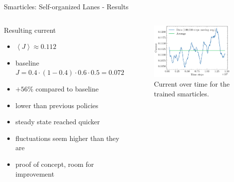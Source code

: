 \documentclass[10pt,xcolor=table, aspectratio=1610]{beamer}
\begin{document}
\begin{frame}{Smarticles: Self-organized Lanes - Results}
  \begin{columns}
    \begin{block}{Resulting current}
      \begin{itemize}
        \item $\left\langle J \right\rangle \approx 0.112$
        \item baseline $J=0.4\cdot(1-0.4)\cdot0.6\cdot0.5=0.072$
        \item $+56\%$ compared to baseline
        \item lower than previous policies
        \item steady state reached quicker
        \item fluctuations seem higher than they are
        \item proof of concept, room for improvement
      \end{itemize}
    \end{block}
    \begin{figure}
        \includegraphics[width=\textwidth]{../Thesis/img/results/lanes_current.pdf}
        \caption*{Current over time for the trained smarticles.}
      \end{figure}
  \end{columns}
\end{frame}
\end{document}
